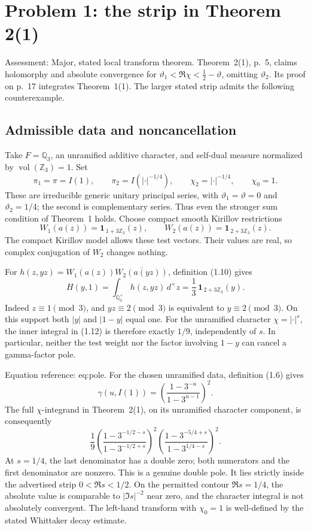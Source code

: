\documentclass[10pt]{article}
\begin{document}
\section*{Problem 1: the strip in Theorem 2(1)}
Assessment: Major, stated local transform theorem. Theorem 2(1), p. 5, claims holomorphy and absolute convergence for \(\vartheta_1<\Re\chi<\tfrac12-\vartheta\), omitting \(\vartheta_2\). Its proof on p. 17 integrates Theorem 1(1). The larger stated strip admits the following counterexample.\par
\subsection*{Admissible data and noncancellation}
Take \(F=\mathbb Q_3\), an unramified additive character, and self-dual measure normalized by \(\operatorname{vol}(\mathbb Z_3)=1\). Set \[\pi_1=\pi=I(1),\qquad
 \pi_2=I(|\cdot|^{-1/4}),\qquad
 \chi_2=|\cdot|^{-1/4},\qquad \chi_0=1.\] These are irreducible generic unitary principal series, with \(\vartheta_1=\vartheta=0\) and \(\vartheta_2=1/4\); the second is complementary series. Thus even the stronger sum condition of Theorem 1 holds. Choose compact smooth Kirillov restrictions \[W_1(a(z))=\mathbf 1_{\,1+3\mathbb Z_3}(z),\qquad
 W_2(a(z))=\mathbf 1_{\,2+3\mathbb Z_3}(z).\] The compact Kirillov model allows these test vectors. Their values are real, so complex conjugation of \(W_2\) changes nothing.\par
For \(h(z,yz)=W_1(a(z))\overline{W_2(a(yz))}\), definition (1.10) gives \[H(y,1)=\int_{\mathbb Q_3^\times}h(z,yz)\,d^\times z
       =\frac13\,\mathbf 1_{\,2+3\mathbb Z_3}(y).\] Indeed \(z\equiv1\pmod3\), and \(yz\equiv2\pmod3\) is equivalent to \(y\equiv2\pmod3\). On this support both \(|y|\) and \(|1-y|\) equal one. For the unramified character \(\chi=|\cdot|^s\), the inner integral in (1.12) is therefore exactly \(1/9\), independently of \(s\). In particular, neither the test weight nor the factor involving \(1-y\) can cancel a gamma-factor pole.\par
Equation reference: eq:pole. For the chosen unramified data, definition (1.6) gives \[\gamma(u,I(1))
 =\left(\frac{1-3^{-u}}{1-3^{u-1}}\right)^2.\] The full \(\chi\)-integrand in Theorem 2(1), on its unramified character component, is consequently \[
 \frac19
 \left(\frac{1-3^{-1/2-s}}{1-3^{-1/2+s}}\right)^2
 \left(\frac{1-3^{-5/4+s}}{1-3^{1/4-s}}\right)^2 .\] At \(s=1/4\), the last denominator has a double zero; both numerators and the first denominator are nonzero. This is a genuine double pole. It lies strictly inside the advertised strip \(0<\Re s<1/2\). On the permitted contour \(\Re s=1/4\), the absolute value is comparable to \(|\Im s|^{-2}\) near zero, and the character integral is not absolutely convergent. The left-hand transform with \(\chi_0=1\) is well-defined by the stated Whittaker decay estimate.\par
\end{document}
